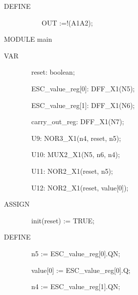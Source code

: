 \documentclass[a4paper]{article}
\begin{document}
\begin{center}
\begin{minipage}{6.06667in}
{\ttfamily\color[rgb]{0.0,0.0,0.039215688}
DEFINE}

{\ttfamily\color[rgb]{0.0,0.0,0.039215688}
\ \ \ \ \ \ \ \ \ \ \ OUT :=!(A1{\textbar}A2);}

{\ttfamily\color[rgb]{0.0,0.0,0.039215688}
MODULE main}

{\ttfamily\color[rgb]{0.0,0.0,0.039215688}
VAR}

{\ttfamily\color[rgb]{0.0,0.0,0.039215688}
\ \ \ \ \ \ \ \ reset: boolean;}

{\ttfamily\color[rgb]{0.0,0.0,0.039215688}
\ \ \ \ \ \ \ \ ESC\_value\_reg[0]: DFF\_X1(N5);}

{\ttfamily\color[rgb]{0.0,0.0,0.039215688}
\ \ \ \ \ \ \ \ ESC\_value\_reg[1]: DFF\_X1(N6);}

{\ttfamily\color[rgb]{0.0,0.0,0.039215688}
\ \ \ \ \ \ \ \ carry\_out\_reg: DFF\_X1(N7);}

{\ttfamily\color[rgb]{0.0,0.0,0.039215688}
\ \ \ \ \ \ \ \ U9: NOR3\_X1(n4, reset, n5);}

{\ttfamily\color[rgb]{0.0,0.0,0.039215688}
\ \ \ \ \ \ \ \ U10: MUX2\_X1(N5, n6, n4);}

{\ttfamily\color[rgb]{0.0,0.0,0.039215688}
\ \ \ \ \ \ \ \ U11: NOR2\_X1(reset, n5);}

{\ttfamily\color[rgb]{0.0,0.0,0.039215688}
\ \ \ \ \ \ \ \ U12: NOR2\_X1(reset, value[0]);\ }

{\ttfamily\color[rgb]{0.0,0.0,0.039215688}
ASSIGN}

{\ttfamily\color[rgb]{0.0,0.0,0.039215688}
\ \ \ \ \ \ \ \ init(reset) := TRUE;}

{\ttfamily\color[rgb]{0.0,0.0,0.039215688}
DEFINE}

{\ttfamily\color[rgb]{0.0,0.0,0.039215688}
\ \ \ \ \ \ \ \ n5 := ESC\_value\_reg[0].QN;}

{\ttfamily\color[rgb]{0.0,0.0,0.039215688}
\ \ \ \ \ \ \ \ value[0] := ESC\_value\_reg[0].Q;}

{\ttfamily\color[rgb]{0.0,0.0,0.039215688}
\ \ \ \ \ \ \ \ n4 := ESC\_value\_reg[1].QN;}


\bigskip


\bigskip
\end{minipage}
\end{center}

\bigskip


\bigskip


\bigskip


\bigskip


\bigskip
\end{document}
